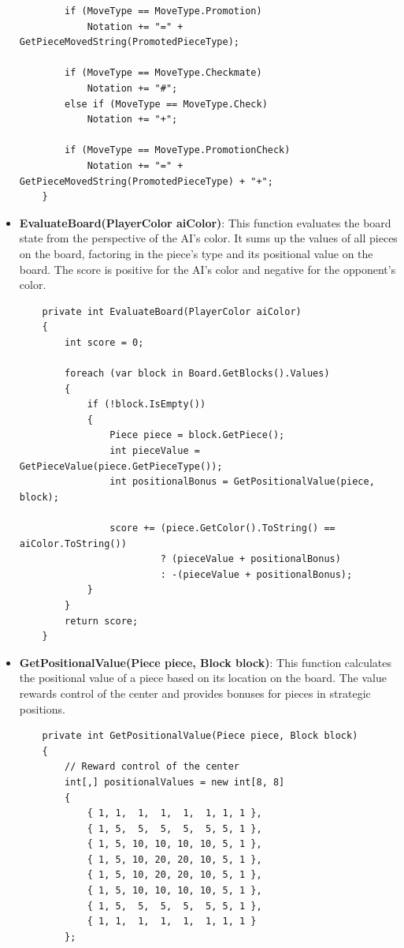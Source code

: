\documentclass[a4paper,12pt]{article}
\begin{document}
\begin{itemize}
\begin{verbatim}
        if (MoveType == MoveType.Promotion)
            Notation += "=" + GetPieceMovedString(PromotedPieceType);

        if (MoveType == MoveType.Checkmate)
            Notation += "#";
        else if (MoveType == MoveType.Check)
            Notation += "+";

        if (MoveType == MoveType.PromotionCheck)
            Notation += "=" + GetPieceMovedString(PromotedPieceType) + "+";
    }
    \end{verbatim}

    \item \textbf{EvaluateBoard(PlayerColor aiColor)}: 
    This function evaluates the board state from the perspective of the AI's color. It sums up the values of all pieces on the board, factoring in the piece's type and its positional value on the board. The score is positive for the AI's color and negative for the opponent's color.

    \begin{verbatim}
    private int EvaluateBoard(PlayerColor aiColor)
    {
        int score = 0;

        foreach (var block in Board.GetBlocks().Values)
        {
            if (!block.IsEmpty())
            {
                Piece piece = block.GetPiece();
                int pieceValue = GetPieceValue(piece.GetPieceType());
                int positionalBonus = GetPositionalValue(piece, block);

                score += (piece.GetColor().ToString() == aiColor.ToString())
                         ? (pieceValue + positionalBonus)
                         : -(pieceValue + positionalBonus);
            }
        }
        return score;
    }
    \end{verbatim}

    \item \textbf{GetPositionalValue(Piece piece, Block block)}: 
    This function calculates the positional value of a piece based on its location on the board. The value rewards control of the center and provides bonuses for pieces in strategic positions.

    \begin{verbatim}
    private int GetPositionalValue(Piece piece, Block block)
    {
        // Reward control of the center
        int[,] positionalValues = new int[8, 8]
        {
            { 1, 1,  1,  1,  1,  1, 1, 1 },
            { 1, 5,  5,  5,  5,  5, 5, 1 },
            { 1, 5, 10, 10, 10, 10, 5, 1 },
            { 1, 5, 10, 20, 20, 10, 5, 1 },
            { 1, 5, 10, 20, 20, 10, 5, 1 },
            { 1, 5, 10, 10, 10, 10, 5, 1 },
            { 1, 5,  5,  5,  5,  5, 5, 1 },
            { 1, 1,  1,  1,  1,  1, 1, 1 }
        };


\end{verbatim}
\end{itemize}
\end{document}
